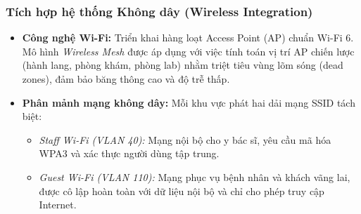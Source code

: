 \subsubsection{Tích hợp hệ thống Không dây (Wireless Integration)}
\begin{itemize}
    \item \textbf{Công nghệ Wi-Fi:} Triển khai hàng loạt Access Point (AP) chuẩn Wi-Fi 6. Mô hình \textit{Wireless Mesh} được áp dụng với việc tính toán vị trí AP chiến lược (hành lang, phòng khám, phòng lab) nhằm triệt tiêu vùng lõm sóng (dead zones), đảm bảo băng thông cao và độ trễ thấp.
    \item \textbf{Phân mảnh mạng không dây:} Mỗi khu vực phát hai dải mạng SSID tách biệt:
    \begin{itemize}
        \item \textit{Staff Wi-Fi (VLAN 40):} Mạng nội bộ cho y bác sĩ, yêu cầu mã hóa WPA3 và xác thực người dùng tập trung.
        \item \textit{Guest Wi-Fi (VLAN 110):} Mạng phục vụ bệnh nhân và khách vãng lai, được cô lập hoàn toàn với dữ liệu nội bộ và chỉ cho phép truy cập Internet.
    \end{itemize}
\end{itemize}

